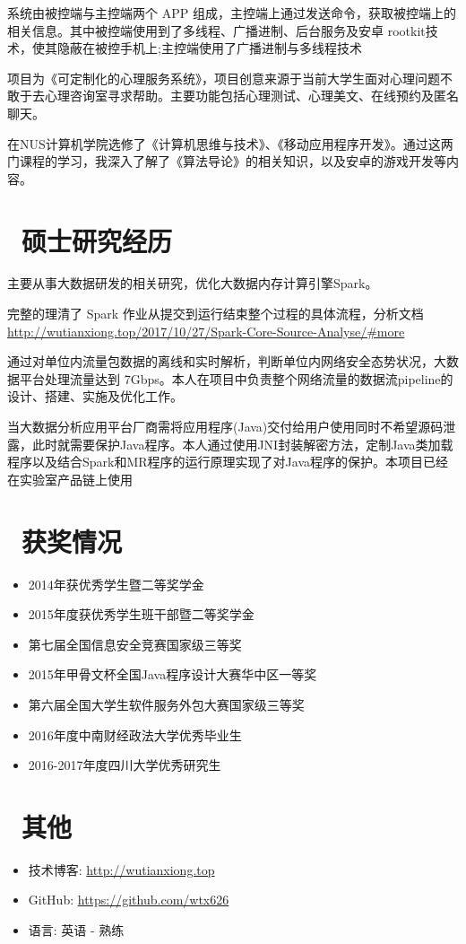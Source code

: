 \documentclass{resume}
\begin{document}
系统由被控端与主控端两个 APP 组成，主控端上通过发送命令，获取被控端上的相关信息。其中被控端使用到了多线程、广播进制、后台服务及安卓 rootkit技术，使其隐蔽在被控手机上;主控端使用了广播进制与多线程技术

项目为《可定制化的心理服务系统》，项目创意来源于当前大学生面对心理问题不敢于去心理咨询室寻求帮助。主要功能包括心理测试、心理美文、在线预约及匿名聊天。

在NUS计算机学院选修了《计算机思维与技术》、《移动应用程序开发》。通过这两门课程的学习，我深入了解了《算法导论》的相关知识，以及安卓的游戏开发等内容。

\section{\faUsers\ \textbf{硕士研究经历}}
主要从事大数据研发的相关研究，优化大数据内存计算引擎Spark。

完整的理清了 Spark 作业从提交到运行结束整个过程的具体流程，分析文档\url{http://wutianxiong.top/2017/10/27/Spark-Core-Source-Analyse/#more } 

通过对单位内流量包数据的离线和实时解析，判断单位内网络安全态势状况，大数据平台处理流量达到 7Gbps。本人在项目中负责整个网络流量的数据流pipeline的设计、搭建、实施及优化工作。

当大数据分析应用平台厂商需将应用程序(Java)交付给用户使用同时不希望源码泄露，此时就需要保护Java程序。本人通过使用JNI封装解密方法，定制Java类加载程序以及结合Spark和MR程序的运行原理实现了对Java程序的保护。本项目已经在实验室产品链上使用
\section{\faHeartO\ \textbf{获奖情况}}
\begin{itemize}[parsep=0.5ex]
  \item 2014年获优秀学生暨二等奖学金
  \item 2015年度获优秀学生班干部暨二等奖学金
  \item 第七届全国信息安全竞赛国家级三等奖
  \item 2015年甲骨文杯全国Java程序设计大赛华中区一等奖
  \item 第六届全国大学生软件服务外包大赛国家级三等奖
  \item 2016年度中南财经政法大学优秀毕业生 
  \item 2016-2017年度四川大学优秀研究生
\end{itemize}
\section{\faInfo\ 其他}
\begin{itemize}[parsep=0.5ex]
	\item 技术博客: \url{http://wutianxiong.top}
	\item GitHub: \url{https://github.com/wtx626}
	\item 语言: 英语 - 熟练
\end{itemize}
\end{document}
